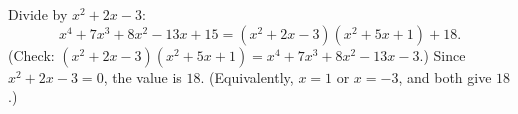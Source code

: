 Divide by $x^2+2x-3$:
\[
x^4+7x^3+8x^2-13x+15=\left(x^2+2x-3\right)\left(x^2+5x+1\right)+18 .
\]
(Check: $\left(x^2+2x-3\right)\left(x^2+5x+1\right)=x^4+7x^3+8x^2-13x-3$.) Since $x^2+2x-3=0$, the value is $\boxed{18}$. (Equivalently, $x=1$ or $x=-3$, and both give $18$.)
